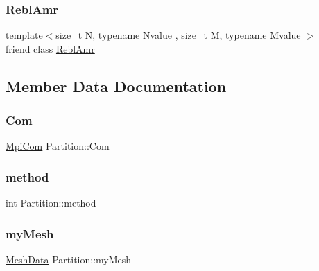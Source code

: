 \subsubsection{\texorpdfstring{Rebl\+Amr}{ReblAmr}}
{\footnotesize\ttfamily template$<$size\+\_\+t N, typename Nvalue , size\+\_\+t M, typename Mvalue $>$ \\
friend class \mbox{\hyperlink{classReblAmr}{Rebl\+Amr}}\hspace{0.3cm}{\ttfamily [friend]}}



\subsection{Member Data Documentation}
\mbox{\label{classPartition_a40cdff1a2a978d2d3afef76f89f77315}} 
\subsubsection{\texorpdfstring{Com}{Com}}
{\footnotesize\ttfamily \mbox{\hyperlink{structMpiCom}{Mpi\+Com}} Partition\+::\+Com\hspace{0.3cm}{\ttfamily [private]}}

\mbox{\label{classPartition_a2020845648e68361210ac8c0dbef2d0a}} 
\subsubsection{\texorpdfstring{method}{method}}
{\footnotesize\ttfamily int Partition\+::method\hspace{0.3cm}{\ttfamily [private]}}

\mbox{\label{classPartition_a1dd04c2f5f7bf180b4b11058324dfd1a}} 
\subsubsection{\texorpdfstring{my\+Mesh}{myMesh}}
{\footnotesize\ttfamily \mbox{\hyperlink{structMeshData}{Mesh\+Data}} Partition\+::my\+Mesh\hspace{0.3cm}{\ttfamily [private]}}

